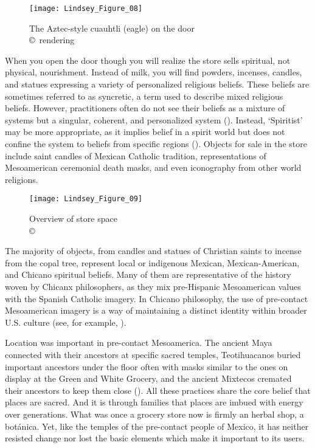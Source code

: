\begin{figure}[!tb]
	\texttt{[image: Lindsey\_Figure\_08]}
	\caption{The Aztec-style cuauhtli (eagle) on the door\\
		{\normalfont\scriptsize \copyright\
			\shortauthor rendering
	}}
	\label{fig:Lindsey_Figure_08}
\end{figure}

When you open the door though you will realize the store sells spiritual, not physical, nourishment. Instead of milk, you will find powders, incenses, candles, and statues expressing a variety of personalized religious beliefs. These beliefs are sometimes referred to as syncretic, a term used to describe mixed religious beliefs. However, practitioners often do not see their beliefs as a mixture of systems but a singular, coherent, and personalized system (\cites{romberg1998}{romberg2005}). Instead, ‘Spiritist’ may be more appropriate, as it implies belief in a spirit world but does not confine the system to beliefs from specific regions (\cite{romberg2005}). Objects for sale in the store include saint candles of Mexican Catholic tradition, representations of Mesoamerican ceremonial death masks, and even iconography from other world religions.

\begin{figure}[!tb]
	\texttt{[image: Lindsey\_Figure\_09]}
	\caption{Overview of store space\\
		{\normalfont\scriptsize \copyright\
			\shortauthor
	}}
	\label{fig:Lindsey_Figure_09}
\end{figure}

The majority of objects, from candles and statues of Christian saints to incense from the copal tree, represent local or indigenous Mexican, Mexican-American, and Chicano spiritual beliefs. Many of them are representative of the history woven by Chicanx philosophers, as they mix pre-Hispanic Mesoamerican values with the Spanish Catholic imagery. In Chicano philosophy, the use of pre-contact Mesoamerican imagery is a way of maintaining a distinct identity within broader U.S. culture (see, for example, \cite{anzaldua}).

Location was important in pre-contact Mesoamerica. The ancient Maya connected with their ancestors at specific sacred temples, Teotihuacanos buried important ancestors under the floor often with masks similar to the ones on display at the Green and White Grocery, and the ancient Mixtecos cremated their ancestors to keep them close (\cites[184]{ashmore}{linne}[7]{joyce}). All these practices share the core belief that places are sacred. And it is through families that places are imbued with energy over generations. What was once a grocery store now is firmly an herbal shop, a botánica. Yet, like the temples of the pre-contact people of Mexico, it has neither resisted change nor lost the basic elements which make it important to its users.

